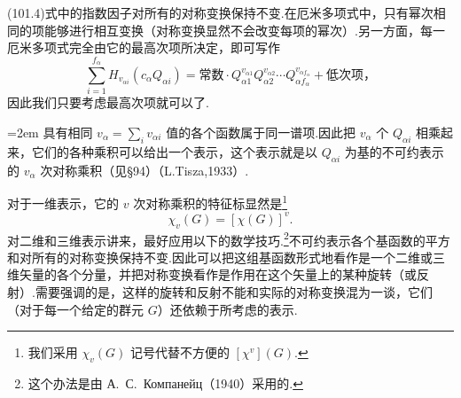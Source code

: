 (101.4)式中的指数因子对所有的对称变换保持不变.在厄米多项式中，只有幂次相同的项能够进行相互变换（对称变换显然不会改变每项的幂次）.另一方面，每一厄米多项式完全由它的最高次项所决定，即可写作
\begin{equation*}
  \sum_{i=1}^{f_\alpha}H_{v_{\alpha i}}(c_\alpha Q_{\alpha i})
  =\text{常数}\cdot Q_{\alpha 1}^{v_{\alpha 1}}Q_{\alpha 2}^{v_{\alpha 2}}
  \cdots Q_{\alpha f_\alpha}^{v_{\alpha f_\alpha}}+\text{低次项，}
\end{equation*}
因此我们只要考虑最高次项就可以了.

\emergencystretch=2em%
具有相同 $v_\alpha=\sum_i v_{\alpha i}$ 值的各个函数属于同一谱项.因此把 $v_\alpha$ 个 $Q_{\alpha i}$ 相乘起来，它们的各种乘积可以给出一个表示，这个表示就是以 $Q_{\alpha i}$ 为基的不可约表示的 $v_\alpha$ 次对称乘积（见§94）（L.Tisza,1933）.

\emergencystretch=0pt%


对于一维表示，它的 $v$ 次对称乘积的特征标显然是\footnote{我们采用 $\chi_v(G)$ 记号代替不方便的 $[\chi^v](G)$.}
\begin{equation*}
  \chi_v(G)=[\chi(G)]^v.
\end{equation*}
对二维和三维表示讲来，最好应用以下的数学技巧.\footnote{这个办法是由 А.~С.~Компанейц（1940）采用的.}不可约表示各个基函数的平方和对所有的对称变换保持不变.因此可以把这组基函数形式地看作是一个二维或三维矢量的各个分量，并把对称变换看作是作用在这个矢量上的某种旋转（或反射）.需要强调的是，这样的旋转和反射不能和实际的对称变换混为一谈，它们（对于每一个给定的群元 $G$）还依赖于所考虑的表示.

